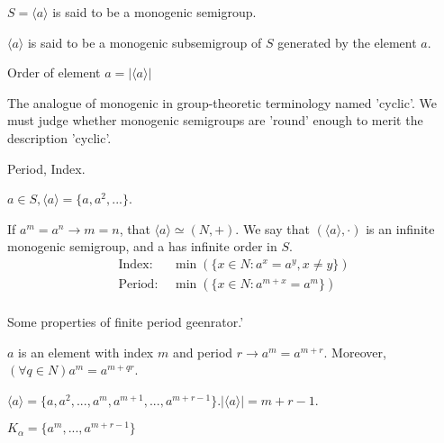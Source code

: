 \begin{Def}
    $S=\langle a\rangle$ is said to be a monogenic semigroup.

    $\langle a\rangle$ is said to be a monogenic subsemigroup of $S$ generated by the element $a$.

    Order of element $a = |\langle a\rangle|$

    The analogue of monogenic in group-theoretic terminology named 'cyclic'. We must judge whether monogenic semigroups are 'round' enough to merit the description 'cyclic'. 
\end{Def}

\begin{Def}Period, Index.

    $a\in S, \langle a\rangle=\{a,a^2,...\}$.

    If $a^m=a^n\rightarrow m=n$, that $\langle a\rangle \simeq (N,+)$. We say that $(\langle a\rangle, \cdot)$ is an infinite monogenic semigroup, and a has infinite order in $S$.
    \begin{align*}
        \text{Index: } & \min(\{x \in N: a^x=a^y,x\neq y\})   \\
        \text{Period: }& \min(\{x\in N: a^{m+x}=a^m\})  \\
    \end{align*}
\end{Def}

\begin{Exap}
    Some properties of finite period geenrator.'
    
    $a$ is an element with index $m$ and period $r \rightarrow a^m=a^{m+r}$.
    Moreover, $(\forall q \in N)a^m=a^{m+qr}$.
    
    $\langle a\rangle=\{a,a^2,...,a^m,a^{m+1},...,a^{m+r-1}\}.|\langle a\rangle|=m+r-1$.
\end{Exap}

\begin{Def}
    $K_\alpha=\{a^m,...,a^{m+r-1}\}$
\end{Def}

